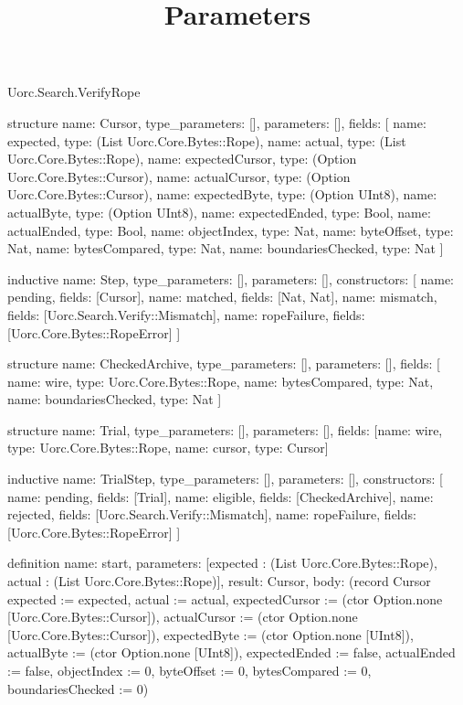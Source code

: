\begin{lexlean}{Uorc.Search.VerifyRope}
\title{Parameters}
\begin{semanticmodule}
structure{
  name: Cursor,
  type_parameters: [],
  parameters: [],
  fields: [
    {name: expected, type: (List Uorc.Core.Bytes::Rope)},
    {name: actual, type: (List Uorc.Core.Bytes::Rope)},
    {name: expectedCursor, type: (Option Uorc.Core.Bytes::Cursor)},
    {name: actualCursor, type: (Option Uorc.Core.Bytes::Cursor)},
    {name: expectedByte, type: (Option UInt8)},
    {name: actualByte, type: (Option UInt8)},
    {name: expectedEnded, type: Bool},
    {name: actualEnded, type: Bool},
    {name: objectIndex, type: Nat},
    {name: byteOffset, type: Nat},
    {name: bytesCompared, type: Nat},
    {name: boundariesChecked, type: Nat}
  ]
}

inductive{
  name: Step,
  type_parameters: [],
  parameters: [],
  constructors: [
    {name: pending, fields: [Cursor]},
    {name: matched, fields: [Nat, Nat]},
    {name: mismatch, fields: [Uorc.Search.Verify::Mismatch]},
    {name: ropeFailure, fields: [Uorc.Core.Bytes::RopeError]}
  ]
}

structure{
  name: CheckedArchive,
  type_parameters: [],
  parameters: [],
  fields: [
    {name: wire, type: Uorc.Core.Bytes::Rope},
    {name: bytesCompared, type: Nat},
    {name: boundariesChecked, type: Nat}
  ]
}

structure{
  name: Trial,
  type_parameters: [],
  parameters: [],
  fields: [{name: wire, type: Uorc.Core.Bytes::Rope}, {name: cursor, type: Cursor}]
}

inductive{
  name: TrialStep,
  type_parameters: [],
  parameters: [],
  constructors: [
    {name: pending, fields: [Trial]},
    {name: eligible, fields: [CheckedArchive]},
    {name: rejected, fields: [Uorc.Search.Verify::Mismatch]},
    {name: ropeFailure, fields: [Uorc.Core.Bytes::RopeError]}
  ]
}

definition{
  name: start,
  parameters: [expected : (List Uorc.Core.Bytes::Rope), actual : (List Uorc.Core.Bytes::Rope)],
  result: Cursor,
  body: (record Cursor {expected := expected, actual := actual, expectedCursor := (ctor Option.none [Uorc.Core.Bytes::Cursor]), actualCursor := (ctor Option.none [Uorc.Core.Bytes::Cursor]), expectedByte := (ctor Option.none [UInt8]), actualByte := (ctor Option.none [UInt8]), expectedEnded := false, actualEnded := false, objectIndex := 0, byteOffset := 0, bytesCompared := 0, boundariesChecked := 0})
}


\end{semanticmodule}
\end{lexlean}

